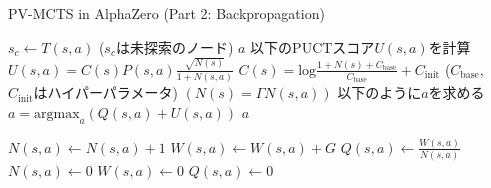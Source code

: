 \begin{algorithm}
    \caption{PV-MCTS in AlphaZero (Part 2: Backpropagation)}
    \label{alg:mcts-2}
    \begin{algorithmic}[1]
                \State $s_c \gets T(s, a)$ ($s_c$は未探索のノード)
                \State {}
                \State \Return $a$
            \Else
                \State 以下のPUCTスコア$U(s, a)$を計算
                \State $U(s, a)= C(s)P(s, a)\frac{\sqrt{N(s)}}{1+N(s, a)}$
                \State $C(s)=\textrm{log}\frac{1+N(s)+C_{\textrm{base}}}{C_{\textrm{base}}}+C_{\textrm{init}}$
                \State($C_{\textrm{base}}$, $C_{\textrm{init}}$はハイパーパラメータ)
                \State $(N(s)=\Gamma N(s, a))$
                \State 以下のように$a$を求める
                \State $a = {\textrm{argmax}}_a (Q(s, a)+U(s, a))$
                \State \Return $a$
                
            \EndIf
        \EndFunction
                \State $N(s, a) \gets  N(s, a)+1$
                \State $W(s, a) \gets  W(s, a)+G$
                \State $Q(s, a) \gets \frac{W(s, a)}{N(s, a)}$
            \EndFor
        \EndFunction
                \State $N(s, a) \gets 0$
                \State $W(s, a) \gets 0$
                \State $Q(s, a) \gets 0$
            \EndFor
        \EndFunction
    \end{algorithmic}
\end{algorithm}

